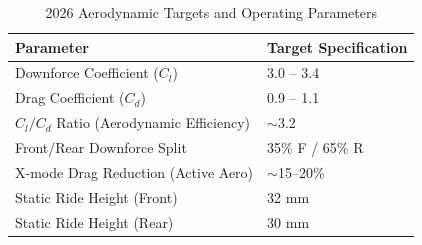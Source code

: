 \begin{table}[h]
\centering
\caption{2026 Aerodynamic Targets and Operating Parameters}
\vspace{0.2cm}
\begin{tabularx}{\textwidth}{@{}XX@{}}
\toprule
\textbf{Parameter} & \textbf{Target Specification} \\
\midrule
Downforce Coefficient ($C_l$) & 3.0 -- 3.4 \\
Drag Coefficient ($C_d$) & 0.9 -- 1.1 \\
$C_l / C_d$ Ratio (Aerodynamic Efficiency) & $\sim$3.2 \\
Front/Rear Downforce Split & 35\% F / 65\% R \\
X-mode Drag Reduction (Active Aero) & $\sim$15--20\% \\
Static Ride Height (Front) & 32 mm \\
Static Ride Height (Rear) & 30 mm \\
\bottomrule
\end{tabularx}
\label{tab:aero_targets}
\end{table}

